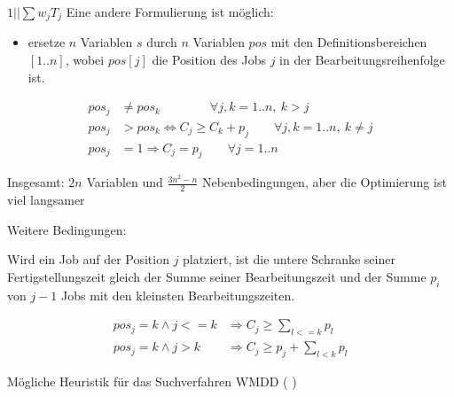 \documentclass[hyperref={pdfpagelabels=false}]{beamer}
\begin{document}
\begin{frame}[allowframebreaks]{$1||\sum{w_jT_j}$}
Eine andere Formulierung ist möglich:
\begin{itemize}
\item ersetze $n$ Variablen $s$ durch $n$ Variablen $pos$ mit den Definitionsbereichen $[1..n]$, wobei $pos[j]$ die Position des Jobs $j$ in der Bearbeitungsreihenfolge ist.
\end{itemize}
\begin{block}{} \begin{align}
	pos_j & \not= pos_k\qquad\qquad \forall j,k=1..n,\ k>j \nonumber \\
	pos_j  & > pos_k \Leftrightarrow  C_j \ge C_k + p_j \qquad \forall j,k=1..n,\ k\not=j \nonumber \\
	pos_j  & = 1 \Rightarrow C_j=p_j \qquad \forall j=1..n \nonumber
\end{align} \end{block}
Insgesamt: $2n$ Variablen und $\frac{3n^2-n}{2}$ Nebenbedingungen, aber die Optimierung ist viel langsamer

\newpage
{\small
Weitere Bedingungen:

\vspace{10pt}
 Wird ein Job auf der Position $j$ platziert, ist die untere Schranke seiner Fertigstellungszeit gleich der Summe seiner Bearbeitungszeit und der Summe $p_i$ von $j-1$ Jobs mit den kleinsten Bearbeitungszeiten.
\begin{block}{}
\begin{align}
  pos_j=k \wedge j<=k  & \Rightarrow C_j \ge \sum_{l<=k} p_l \nonumber \\
  pos_j=k \wedge j>k  & \Rightarrow C_j \ge p_j+\sum_{l<k} p_l \nonumber 
\end{align}
\end{block}
\vspace{8pt}
Mögliche Heuristik für das Suchverfahren WMDD ( \grqq)
}
\end{frame}
\end{document}
